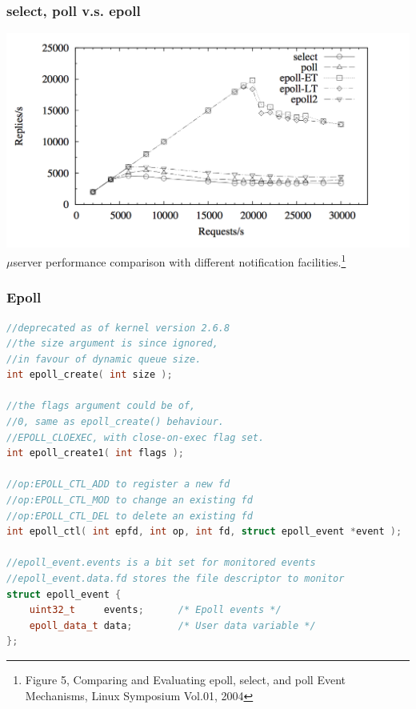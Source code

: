 \documentclass[aspectratio=43]{beamer}
\begin{document}
\begin{frame}[fragile]
  \frametitle{select, poll v.s. epoll}
  \begin{center}
  \includegraphics[scale=0.5]{select_poll_epoll_perf.png}\\
  {\footnotesize $\mu$server performance comparison with different notification facilities.\footnote{\tiny Figure 5, Comparing and Evaluating epoll, select, and poll Event Mechanisms, Linux Symposium Vol.01, 2004}}
  \end{center}
\end{frame}

\begin{frame}[fragile]
  \frametitle{Epoll}
    \begin{lstlisting}[language=C++,basicstyle=\ttfamily\scriptsize,commentstyle=\color{commgreen},keywordstyle=\color{blue},breaklines=true]
//deprecated as of kernel version 2.6.8
//the size argument is since ignored,
//in favour of dynamic queue size.
int epoll_create( int size );

//the flags argument could be of,
//0, same as epoll_create() behaviour.
//EPOLL_CLOEXEC, with close-on-exec flag set.
int epoll_create1( int flags );

//op:EPOLL_CTL_ADD to register a new fd
//op:EPOLL_CTL_MOD to change an existing fd
//op:EPOLL_CTL_DEL to delete an existing fd
int epoll_ctl( int epfd, int op, int fd, struct epoll_event *event );

//epoll_event.events is a bit set for monitored events
//epoll_event.data.fd stores the file descriptor to monitor
struct epoll_event {
    uint32_t     events;      /* Epoll events */
    epoll_data_t data;        /* User data variable */
};

\end{lstlisting}
\end{frame}
\end{document}
